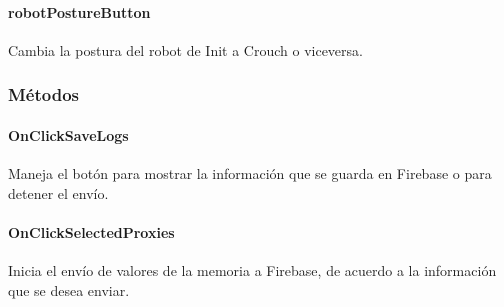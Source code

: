 \paragraph{robotPostureButton}
\label{\detokenize{dev_docs:robotposturebutton}}

\begin{fulllineitems}
\label{\detokenize{dev_docs:com.lar.cloudnao.RemoteControllerActivity.robotPostureButton}}
Cambia la postura del robot de Init a Crouch o viceversa.

\end{fulllineitems}



\subsubsection{Métodos}
\label{\detokenize{dev_docs:id13}}

\paragraph{OnClickSaveLogs}
\label{\detokenize{dev_docs:onclicksavelogs}}

\begin{fulllineitems}
\label{\detokenize{dev_docs:com.lar.cloudnao.RemoteControllerActivity.OnClickSaveLogs()}}
Maneja el botón para mostrar la información que se guarda en Firebase o para detener el envío.

\end{fulllineitems}



\paragraph{OnClickSelectedProxies}
\label{\detokenize{dev_docs:onclickselectedproxies}}

\begin{fulllineitems}
\label{\detokenize{dev_docs:com.lar.cloudnao.RemoteControllerActivity.OnClickSelectedProxies()}}
Inicia el envío de valores de la memoria a Firebase, de acuerdo a la información que se desea enviar.

\end{fulllineitems}



